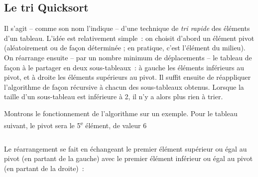 
	\subsection{Le tri Quicksort}
	
		Il s'agit -- comme son nom l'indique -- d'une technique de 
		\textit{tri rapide} des éléments d'un tableau. L'idée est
		relativement simple~: on choisit d'abord un élément pivot 
		(aléatoirement ou de façon déterminée ; en pratique, c'est
		l'élément du milieu). On réarrange ensuite -- par un nombre 
		minimum de déplacements -- le tableau de façon à le partager 
		en deux sous-tableaux~: à gauche les éléments inférieurs au 
		pivot, et à droite les éléments supérieurs au pivot. Il suffit 
		ensuite de réappliquer l'algorithme de façon récursive à chacun 
		des sous-tableaux obtenus. Lorsque la taille d'un sous-tableau 
		est inférieure à 2, il n'y a alors plus rien à trier.

		Montrons le fonctionnement de l'algorithme sur un exemple. 
		Pour le tableau suivant, le pivot sera le 5\textsuperscript{e} 
		élément, de valeur 6~

		\begin{center}
			\tablefirsthead{}
			\tablehead{}
			\tabletail{}
			\tablelasttail{}
			\begin{supertabular}{|m{1.171cm}|m{1.206cm}|m{1.206cm}|m{1.206cm}|m{1.206cm}|m{1.206cm}|m{1.206cm}|m{1.206cm}|m{1.206cm}|m{1.232cm}|}
			\hline
			 &
			 &
			 &
			 &
			 &
			 &
			 &
			 &
			 &
			\centering{}\\\hline
			\end{supertabular}
		\end{center}

		Le réarrangement se fait en échangeant le premier élément supérieur 
		ou égal au pivot (en partant de la gauche) avec le premier élément 
		inférieur ou égal au pivot (en partant de la droite)~:

